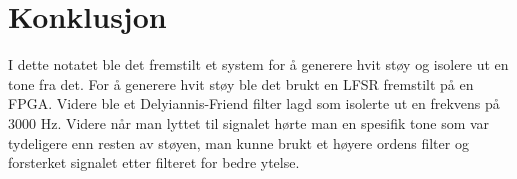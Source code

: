 \clearpage
\section{Konklusjon}
\label{konklusjon}

I dette notatet ble det fremstilt et system for å generere hvit støy og isolere ut en tone fra
det. For å generere hvit støy ble det brukt en LFSR fremstilt på en FPGA. Videre ble et
Delyiannis-Friend filter lagd som isolerte ut en frekvens på 3000 Hz. Videre når man lyttet
til signalet hørte man en spesifik tone som var tydeligere enn resten av støyen, man kunne brukt et høyere ordens filter og forsterket signalet etter filteret for bedre ytelse.